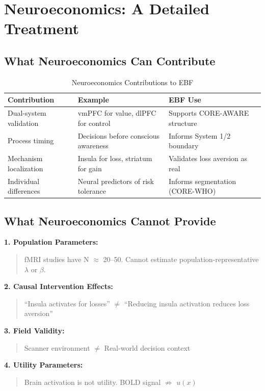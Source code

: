 \documentclass[11pt, a4paper]{article}
\begin{document}
\section{Neuroeconomics: A Detailed Treatment}
\label{sec:evd-neuro}

\subsection{What Neuroeconomics Can Contribute}

\begin{table}[htbp]
\centering
\caption{Neuroeconomics Contributions to EBF}
\label{tab:evd-neuro-contributions}
\renewcommand{\arraystretch}{1.3}
\begin{tabular}{@{}p{4cm}p{4cm}p{4cm}@{}}
\toprule
\textbf{Contribution} & \textbf{Example} & \textbf{EBF Use} \\
\midrule
Dual-system validation & vmPFC for value, dlPFC for control & Supports CORE-AWARE structure \\
Process timing & Decisions before conscious awareness & Informs System 1/2 boundary \\
Mechanism localization & Insula for loss, striatum for gain & Validates loss aversion as real \\
Individual differences & Neural predictors of risk tolerance & Informs segmentation (CORE-WHO) \\
\bottomrule
\end{tabular}
\end{table}

\subsection{What Neuroeconomics Cannot Provide}

\begin{tcolorbox}[colback=red!5!white, colframe=red!75!black,
    title=Limitations of Neural Evidence for EBF]

\textbf{1. Population Parameters:}
\begin{quote}
fMRI studies have N $\approx$ 20--50. Cannot estimate population-representative $\lambda$ or $\beta$.
\end{quote}

\textbf{2. Causal Intervention Effects:}
\begin{quote}
``Insula activates for losses'' $\neq$ ``Reducing insula activation reduces loss aversion''
\end{quote}

\textbf{3. Field Validity:}
\begin{quote}
Scanner environment $\neq$ Real-world decision context
\end{quote}

\textbf{4. Utility Parameters:}
\begin{quote}
Brain activation is not utility. BOLD signal $\not\Rightarrow$ $u(x)$
\end{quote}

\end{tcolorbox}
\end{document}
